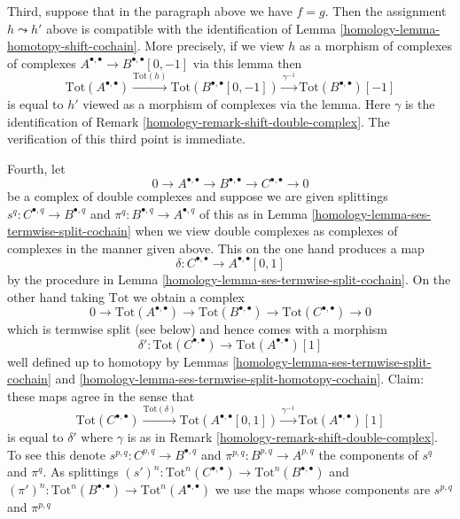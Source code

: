 \begin{remark}
\medskip\noindent
Third, suppose that in the paragraph above we have $f = g$.
Then the assignment $h \leadsto h'$ above is compatible with
the identification of Lemma \ref{homology-lemma-homotopy-shift-cochain}.
More precisely, if we view $h$ as a morphism of complexes
of complexes $A^{\bullet, \bullet} \to B^{\bullet, \bullet}[0, -1]$
via this lemma then
$$
\text{Tot}(A^{\bullet, \bullet})
\xrightarrow{\text{Tot}(h)}
\text{Tot}(B^{\bullet, \bullet}[0, -1])
\xrightarrow{\gamma^{-1}}
\text{Tot}(B^{\bullet, \bullet})[-1]
$$
is equal to $h'$ viewed as a morphism of complexes via the lemma.
Here $\gamma$ is the identification of
Remark \ref{homology-remark-shift-double-complex}.
The verification of this third point is immediate.

\medskip\noindent
Fourth, let
$$
0 \to A^{\bullet, \bullet} \to B^{\bullet, \bullet} \to
C^{\bullet, \bullet} \to 0
$$
be a complex of double complexes and suppose we are given splittings
$s^q : C^{\bullet, q} \to B^{\bullet, q}$ and
$\pi^q : B^{\bullet, q} \to A^{\bullet, q}$
of this as in Lemma \ref{homology-lemma-ses-termwise-split-cochain}
when we view double complexes
as complexes of complexes in the manner given above.
This on the one hand produces a map
$$
\delta : C^{\bullet, \bullet} \longrightarrow A^{\bullet, \bullet}[0, 1]
$$
by the procedure in Lemma \ref{homology-lemma-ses-termwise-split-cochain}.
On the other hand taking $\text{Tot}$ we obtain a complex
$$
0 \to \text{Tot}(A^{\bullet, \bullet}) \to
\text{Tot}(B^{\bullet, \bullet}) \to
\text{Tot}(C^{\bullet, \bullet}) \to 0
$$
which is termwise split (see below) and hence comes with a morphism
$$
\delta' :
\text{Tot}(C^{\bullet, \bullet})
\longrightarrow
\text{Tot}(A^{\bullet, \bullet})[1]
$$
well defined up to homotopy by Lemmas \ref{homology-lemma-ses-termwise-split-cochain}
and \ref{homology-lemma-ses-termwise-split-homotopy-cochain}. Claim:
these maps agree in the sense that
$$
\text{Tot}(C^{\bullet, \bullet})
\xrightarrow{\text{Tot}(\delta)}
\text{Tot}(A^{\bullet, \bullet}[0, 1]) \xrightarrow{\gamma^{-1}}
\text{Tot}(A^{\bullet, \bullet})[1]
$$
is equal to $\delta'$ where $\gamma$ is as in
Remark \ref{homology-remark-shift-double-complex}. To see this denote
$s^{p, q} : C^{p, q} \to B^{\bullet, q}$ and
$\pi^{p, q} : B^{p, q} \to A^{p, q}$ the components of $s^q$ and $\pi^q$.
As splittings
$(s')^n : \text{Tot}^n(C^{\bullet, \bullet}) \to
\text{Tot}^n(B^{\bullet, \bullet})$
and
$(\pi')^n : \text{Tot}^n(B^{\bullet, \bullet}) \to
\text{Tot}^n(A^{\bullet, \bullet})$
we use the maps whose components are $s^{p, q}$ and $\pi^{p, q}$

\end{remark}
